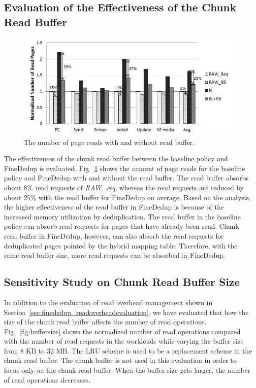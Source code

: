 \subsection{Evaluation of the Effectiveness of the Chunk Read Buffer}
\begin{figure}[t]
	\center
	\includegraphics[scale=0.65]{figure/finededup/readbuffer_result.png}
	\caption{The number of page reads with and without read buffer.} %
	\label{fig:readbuffer}
\end{figure}

The effectiveness of the chunk read buffer between the baseline policy and FineDedup is evaluated. 
Fig.~\ref{fig:readbuffer} shows the amount of page reads for the baseline policy and FineDedup 
with and without the read buffer. 
The read buffer absorbs about 8\% read requests of \textit{RAW\_req}, whereas the read requests are 
reduced by about 25\% with the read buffer for FineDedup on average. 
Based on the analysis, the higher effectiveness of the read buffer in FineDedup is 
because of the increased memory utilization by deduplication. 
The read buffer in the baseline policy can absorb read requests for pages that have already been read. 
Chunk read buffer in FineDedup, however, can also absorb the read requests for deduplicated pages pointed 
by the hybrid mapping table. 
Therefore, with the same read buffer size, more read requests can be absorbed in FineDedup.


\subsection{Sensitivity Study on Chunk Read Buffer Size}
In addition to the evaluation of read overhead management shown in Section~\ref{sec:finededup_readoverheadevaluation},
we have evaluated that how the size of the chunk read buffer affects the number of read operations.
Fig.~\ref{fig:buffersize} shows the normalized number of read operations compared with the number
of read requests in the workloads while varying the buffer size from 8 KB to 32 MB.
The LRU scheme is used to be a replacement scheme in the chunk read buffer.
The chunk buffer is not used in this evaluation in order to focus only on the chunk read buffer.
When the buffer size gets larger, the number of read operations decreases.

